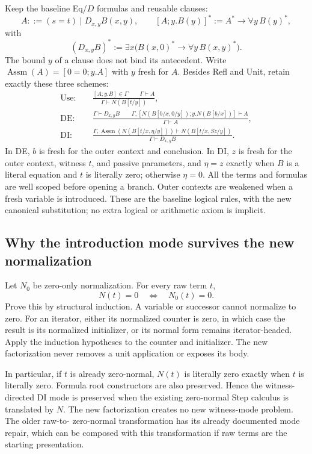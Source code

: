 Keep the baseline Eq/$D$ formulas and reusable clauses:
\[
 A::=(s=t)\mid D_{x,y}B(x,y),\qquad
 [A;y.B(y)]^*:=A^*\to\forall y\,B(y)^*,
\]
with
\[
 (D_{x,y}B)^*:=\exists x\bigl(B(x,0)^*\to\forall y\,B(x,y)^*\bigr).
\]
The bound $y$ of a clause does not bind its antecedent.  Write
$\operatorname{Assm}(A)=[0=0;y.A]$ with $y$ fresh for $A$.
Besides Refl and Unit, retain exactly these three schemes:
\begin{align*}
 \mathrm{Use}:\quad&
 \frac{[A;y.B]\in\Gamma\qquad\Gamma\vdash A}
      {\Gamma\vdash N(B[t/y])},\\[2mm]
 \mathrm{DE}:\quad&
 \frac{\Gamma\vdash D_{x,y}B\qquad
       \Gamma,[N(B[b/x,0/y]);y.N(B[b/x])]\vdash A}
      {\Gamma\vdash A},\\[2mm]
 \mathrm{DI}:\quad&
 \frac{\Gamma,\operatorname{Assm}(N(B[t/x,\eta/y]))
           \vdash N(B[t/x,Sz/y])}
      {\Gamma\vdash D_{x,y}B}.
\end{align*}
In DE, $b$ is fresh for the outer context and conclusion.  In DI, $z$
is fresh for the outer context, witness $t$, and passive parameters,
and $\eta=z$ exactly when $B$ is a literal equation and $t$ is
literally zero; otherwise $\eta=0$.  All the terms and formulas are
well scoped before opening a branch.  Outer contexts are weakened
when a fresh variable is introduced.  These are the baseline logical
rules, with the new canonical substitution; no extra logical or
arithmetic axiom is implicit.

\subsection{Why the introduction mode survives the new normalization}

Let $N_0$ be zero-only normalization.  For every raw term $t$,
\[
                 N(t)=0\quad\Longleftrightarrow\quad N_0(t)=0.
                 \tag{Zero}
\]
Prove this by structural induction.  A variable or successor cannot
normalize to zero.  For an iterator, either its normalized counter is
zero, in which case the result is its normalized initializer, or its
normal form remains iterator-headed.  Apply the induction hypotheses
to the counter and initializer.  The new factorization never removes a
unit application or exposes its body.

In particular, if $t$ is already zero-normal, $N(t)$ is literally zero
exactly when $t$ is literally zero.  Formula root constructors are also
preserved.  Hence the witness-directed DI mode is preserved when the
existing zero-normal Step calculus is translated by $N$.  The new
factorization creates no new witness-mode problem.  The older raw-to-
zero-normal transformation has its already documented mode repair,
which can be composed with this transformation if raw terms are the
starting presentation.

